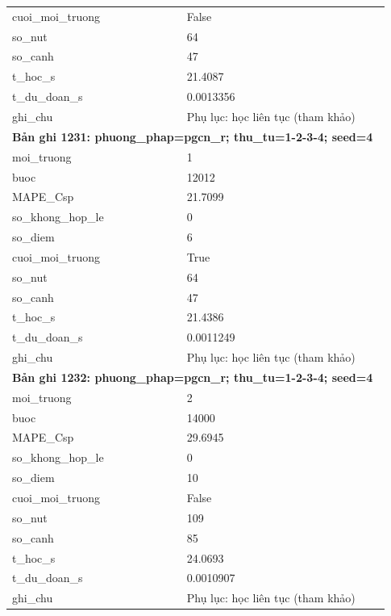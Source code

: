 \begin{longtable}{p{0.43\linewidth}p{0.50\linewidth}}
cuoi\_\allowbreak moi\_\allowbreak truong & False \\
so\_\allowbreak nut & 64 \\
so\_\allowbreak canh & 47 \\
t\_\allowbreak hoc\_\allowbreak s & 21.4087 \\
t\_\allowbreak du\_\allowbreak doan\_\allowbreak s & 0.0013356 \\
ghi\_\allowbreak chu & Phụ lục: học liên tục (tham khảo) \\
\midrule
\multicolumn{2}{p{0.95\linewidth}}{\textbf{Bản ghi 1231: phuong\_phap=pgcn\_r; thu\_tu=1-2-3-4; seed=4}} \\
moi\_\allowbreak truong & 1 \\
buoc & 12012 \\
MAPE\_\allowbreak Csp & 21.7099 \\
so\_\allowbreak khong\_\allowbreak hop\_\allowbreak le & 0 \\
so\_\allowbreak diem & 6 \\
cuoi\_\allowbreak moi\_\allowbreak truong & True \\
so\_\allowbreak nut & 64 \\
so\_\allowbreak canh & 47 \\
t\_\allowbreak hoc\_\allowbreak s & 21.4386 \\
t\_\allowbreak du\_\allowbreak doan\_\allowbreak s & 0.0011249 \\
ghi\_\allowbreak chu & Phụ lục: học liên tục (tham khảo) \\
\midrule
\multicolumn{2}{p{0.95\linewidth}}{\textbf{Bản ghi 1232: phuong\_phap=pgcn\_r; thu\_tu=1-2-3-4; seed=4}} \\
moi\_\allowbreak truong & 2 \\
buoc & 14000 \\
MAPE\_\allowbreak Csp & 29.6945 \\
so\_\allowbreak khong\_\allowbreak hop\_\allowbreak le & 0 \\
so\_\allowbreak diem & 10 \\
cuoi\_\allowbreak moi\_\allowbreak truong & False \\
so\_\allowbreak nut & 109 \\
so\_\allowbreak canh & 85 \\
t\_\allowbreak hoc\_\allowbreak s & 24.0693 \\
t\_\allowbreak du\_\allowbreak doan\_\allowbreak s & 0.0010907 \\
ghi\_\allowbreak chu & Phụ lục: học liên tục (tham khảo) \\

\end{longtable}
